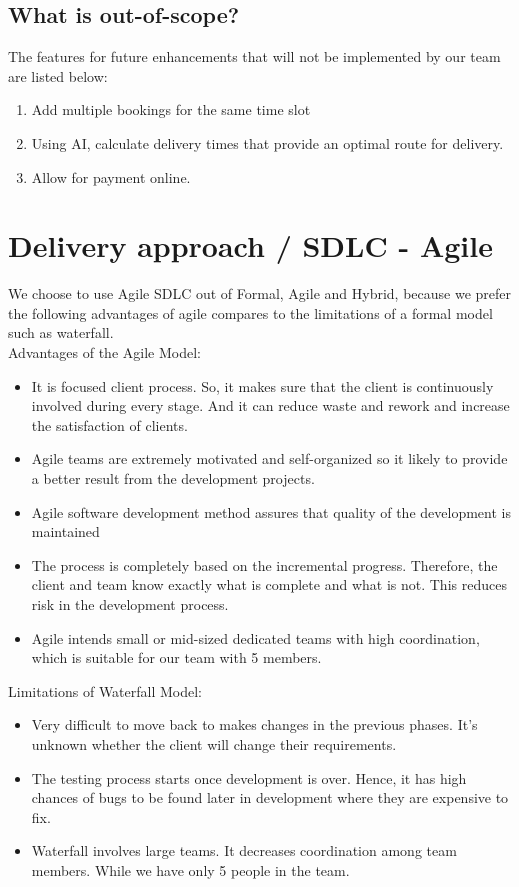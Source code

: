 \documentclass{report}
\begin{document}
\subsection{What is out-of-scope?}
The features for future enhancements that will not be implemented by our team are listed below:
\begin{enumerate}
  \item Add multiple bookings for the same time slot
  \item Using AI, calculate delivery times that provide an optimal route for delivery.
  \item Allow for payment online.
\end{enumerate}
\section{Delivery approach / SDLC - Agile}
We choose to use Agile SDLC out of Formal, Agile and Hybrid, because we prefer the following advantages of agile compares to the limitations of a formal model such as waterfall.\\
Advantages of the Agile Model:
\begin{itemize}
  \item It is focused client process. So, it makes sure that the client is continuously involved during every stage. And it can reduce waste and rework and increase the satisfaction of clients.
  \item Agile teams are extremely motivated and self-organized so it likely to provide a better result from the development projects.
  \item Agile software development method assures that quality of the development is maintained
  \item The process is completely based on the incremental progress. Therefore, the client and team know exactly what is complete and what is not. This reduces risk in the development process.
  \item Agile intends small or mid-sized dedicated teams with high coordination, which is suitable for our team with 5 members.
\end{itemize}
Limitations of Waterfall Model:
\begin{itemize}
  \item Very difficult to move back to makes changes in the previous phases. It's unknown whether the client will change their requirements.
  \item The testing process starts once development is over. Hence, it has high chances of bugs to be found later in development where they are expensive to fix.
  \item Waterfall involves large teams. It decreases coordination among team members. While we have only 5 people in the team.
\end{itemize}
\end{document}
